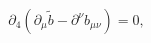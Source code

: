 \begin{equation}\label{mu-4-1}
\partial_4 ( \partial_\mu \tilde b - \partial^\nu  b_{\mu\nu})
= 0,
\end{equation}

